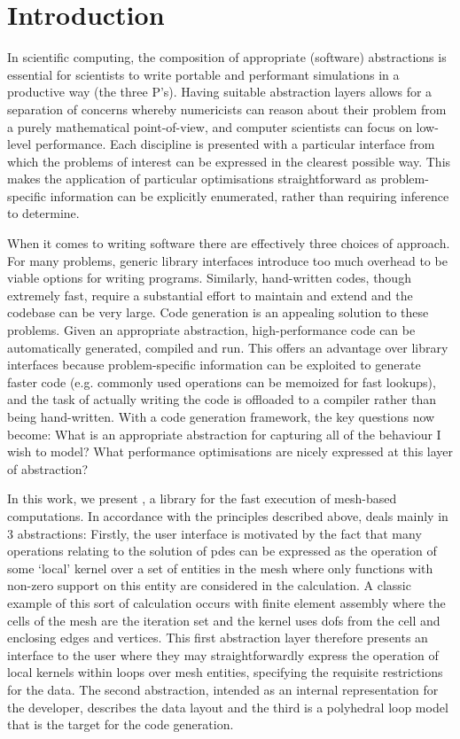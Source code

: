 \section{Introduction}

In scientific computing, the composition of appropriate (software) abstractions is essential for scientists to write portable and performant simulations in a productive way (the three P's).
Having suitable abstraction layers allows for a separation of concerns whereby numericists can reason about their problem from a purely mathematical point-of-view, and computer scientists can focus on low-level performance.
Each discipline is presented with a particular interface from which the problems of interest can be expressed in the clearest possible way.
This makes the application of particular optimisations straightforward as problem-specific information can be explicitly enumerated, rather than requiring inference to determine.

When it comes to writing software there are effectively three choices of approach.
For many problems, generic library interfaces introduce too much overhead to be viable options for writing programs.
Similarly, hand-written codes, though extremely fast, require a substantial effort to maintain and extend and the codebase can be very large.
Code generation is an appealing solution to these problems.
Given an appropriate abstraction, high-performance code can be automatically generated, compiled and run.
This offers an advantage over library interfaces because problem-specific information can be exploited to generate faster code (e.g. commonly used operations can be memoized for fast lookups), and the task of actually writing the code is offloaded to a compiler rather than being hand-written.
With a code generation framework, the key questions now become:
What is an appropriate abstraction for capturing all of the behaviour I wish to model?
What performance optimisations are nicely expressed at this layer of abstraction?

In this work, we present \projectname, a library for the fast execution of mesh-based computations.
In accordance with the principles described above, \projectname deals mainly in 3 abstractions:
Firstly, the user interface is motivated by the fact that many operations relating to the solution of \gls{pde}s can be expressed as the operation of some `local' kernel over a set of entities in the mesh where only functions with non-zero support on this entity are considered in the calculation.
A classic example of this sort of calculation occurs with finite element assembly where the cells of the mesh are the iteration set and the kernel uses \glspl{dof} from the cell and enclosing edges and vertices.
This first abstraction layer therefore presents an interface to the user where they may straightforwardly express the operation of local kernels within loops over mesh entities, specifying the requisite restrictions for the data.
The second abstraction, intended as an internal representation for the developer, describes the data layout and the third is a polyhedral loop model that is the target for the code generation.

